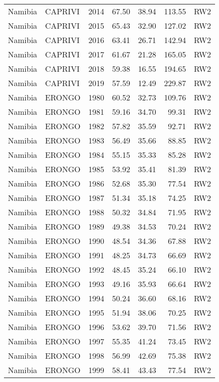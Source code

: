 \begin{longtable}{lllrrrl}
  Namibia & CAPRIVI & 2014 & 67.50 & 38.94 & 113.55 & RW2 \\ 
  Namibia & CAPRIVI & 2015 & 65.43 & 32.90 & 127.02 & RW2 \\ 
  Namibia & CAPRIVI & 2016 & 63.41 & 26.71 & 142.94 & RW2 \\ 
  Namibia & CAPRIVI & 2017 & 61.67 & 21.28 & 165.05 & RW2 \\ 
  Namibia & CAPRIVI & 2018 & 59.38 & 16.55 & 194.65 & RW2 \\ 
  Namibia & CAPRIVI & 2019 & 57.59 & 12.49 & 229.87 & RW2 \\ 
  Namibia & ERONGO & 1980 & 60.52 & 32.73 & 109.76 & RW2 \\ 
  Namibia & ERONGO & 1981 & 59.16 & 34.70 & 99.31 & RW2 \\ 
  Namibia & ERONGO & 1982 & 57.82 & 35.59 & 92.71 & RW2 \\ 
  Namibia & ERONGO & 1983 & 56.49 & 35.66 & 88.85 & RW2 \\ 
  Namibia & ERONGO & 1984 & 55.15 & 35.33 & 85.28 & RW2 \\ 
  Namibia & ERONGO & 1985 & 53.92 & 35.41 & 81.39 & RW2 \\ 
  Namibia & ERONGO & 1986 & 52.68 & 35.30 & 77.54 & RW2 \\ 
  Namibia & ERONGO & 1987 & 51.34 & 35.18 & 74.25 & RW2 \\ 
  Namibia & ERONGO & 1988 & 50.32 & 34.84 & 71.95 & RW2 \\ 
  Namibia & ERONGO & 1989 & 49.38 & 34.53 & 70.24 & RW2 \\ 
  Namibia & ERONGO & 1990 & 48.54 & 34.36 & 67.88 & RW2 \\ 
  Namibia & ERONGO & 1991 & 48.25 & 34.73 & 66.69 & RW2 \\ 
  Namibia & ERONGO & 1992 & 48.45 & 35.24 & 66.10 & RW2 \\ 
  Namibia & ERONGO & 1993 & 49.16 & 35.93 & 66.64 & RW2 \\ 
  Namibia & ERONGO & 1994 & 50.24 & 36.60 & 68.16 & RW2 \\ 
  Namibia & ERONGO & 1995 & 51.94 & 38.06 & 70.25 & RW2 \\ 
  Namibia & ERONGO & 1996 & 53.62 & 39.70 & 71.56 & RW2 \\ 
  Namibia & ERONGO & 1997 & 55.35 & 41.24 & 73.45 & RW2 \\ 
  Namibia & ERONGO & 1998 & 56.99 & 42.69 & 75.38 & RW2 \\ 
  Namibia & ERONGO & 1999 & 58.41 & 43.43 & 77.54 & RW2 \\ 

\end{longtable}
